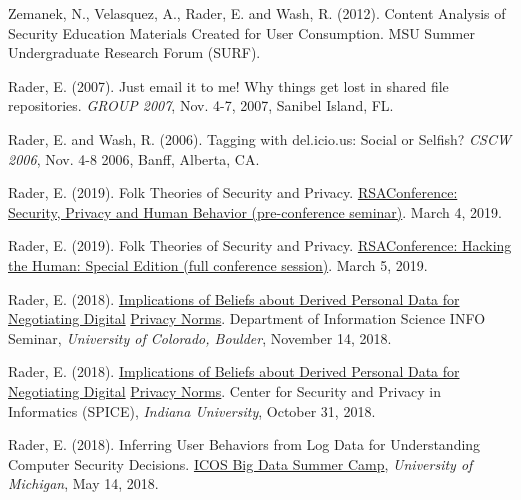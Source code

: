 \documentclass[9pt]{extarticle}
\makeatletter
\renewcommand{\section}{%
  \@startsection{section}{1}{0em}{\baselineskip}{3pt}{\large\bfseries\textsc}}
\makeatother
\begin{document}
Zemanek, N., Velasquez, A., Rader, E. and Wash, R. (2012). Content Analysis of Security Education Materials Created for User Consumption. MSU Summer Undergraduate Research Forum (SURF).
  
Rader, E. (2007). Just email it to me! Why things get lost in shared file repositories. \emph{GROUP 2007}, Nov. 4-7, 2007, Sanibel Island, FL.

Rader, E. and Wash, R. (2006). Tagging with del.icio.us: Social or Selfish? \emph{CSCW 2006}, Nov. 4-8 2006, Banff, Alberta, CA.
 

\section{External Presentations}

Rader, E. (2019). Folk Theories of Security and Privacy. \href{https://www.rsaconference.com/industry-topics/presentation/security-privacy-and-human-behavior}{RSAConference: Security, Privacy and Human Behavior (pre-conference seminar)}. March 4, 2019.

Rader, E. (2019). Folk Theories of Security and Privacy. \href{https://www.rsaconference.com/industry-topics/presentation/security-privacy-and-human-behavior}{RSAConference: Hacking the Human: Special Edition (full conference session)}. March 5, 2019.

Rader, E. (2018). \href{https://calendar.colorado.edu/event/info_seminar_emilee_rader_implications_of_beliefs_about_derived_personal_data}{Implications of Beliefs about Derived Personal Data for Negotiating Digital} \href{https://calendar.colorado.edu/event/info_seminar_emilee_rader_implications_of_beliefs_about_derived_personal_data}{Privacy Norms}. Department of Information Science INFO Seminar, \emph{University of Colorado, Boulder}, November 14, 2018.

Rader, E. (2018). \href{https://spice.sice.indiana.edu/2018/11/02/spice-talk-series-features-professor-emilee-rader}{Implications of Beliefs about Derived Personal Data for Negotiating Digital} \href{https://spice.sice.indiana.edu/2018/11/02/spice-talk-series-features-professor-emilee-rader}{Privacy Norms}. Center for Security and Privacy in Informatics (SPICE), \emph{Indiana University}, October 31, 2018.

Rader, E. (2018). Inferring User Behaviors from Log Data for Understanding Computer Security Decisions. \href{https://icosbigdatacamp.github.io/2018-summer-camp/}{ICOS Big Data Summer Camp}, \emph{University of Michigan}, May 14, 2018.  
\end{document}
